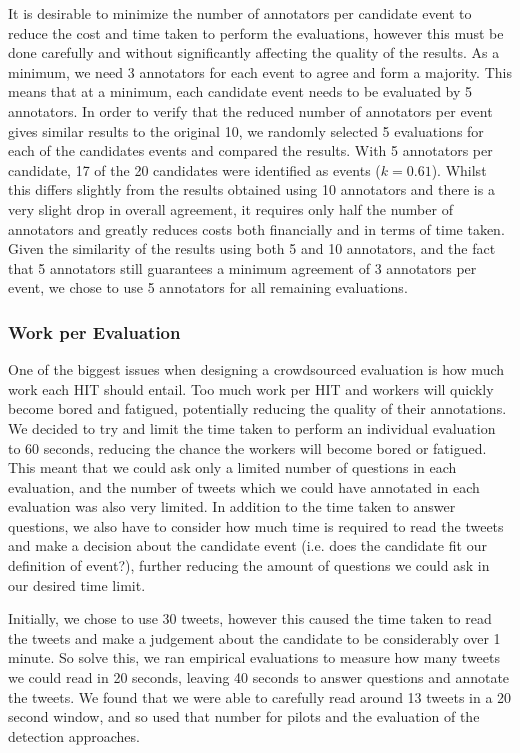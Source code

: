 It is desirable to minimize the number of annotators per candidate event to reduce the cost and time taken to perform the evaluations, however this must be done carefully and without significantly affecting the quality of the results.
As a minimum, we need 3 annotators for each event to agree and form a majority.
This means that at a minimum, each candidate event needs to be evaluated by 5 annotators.
In order to verify that the reduced number of annotators per event gives similar results to the original 10, we randomly selected 5 evaluations for each of the candidates events and compared the results.
With 5 annotators per candidate, 17 of the 20 candidates were identified as events (\(k = 0.61\)).
Whilst this differs slightly from the results obtained using 10 annotators and there is a very slight drop in overall agreement, it requires only half the number of annotators and greatly reduces costs both financially and in terms of time taken.
Given the similarity of the results using both 5 and 10 annotators, and the fact that 5 annotators still guarantees a minimum agreement of 3 annotators per event, we chose to use 5 annotators for all remaining evaluations.

\subsubsection{Work per Evaluation}
\label{sec:work}
One of the biggest issues when designing a crowdsourced evaluation is how much work each HIT should entail.
Too much work per HIT and workers will quickly become bored and fatigued, potentially reducing the quality of their annotations.
We decided to try and limit the time taken to perform an individual evaluation to 60 seconds, reducing the chance the workers will become bored or fatigued.
This meant that we could ask only a limited number of questions in each evaluation, and the number of tweets which we could have annotated in each evaluation was also very limited.
In addition to the time taken to answer questions, we also have to consider how much time is required to read the tweets and make a decision about the candidate event (i.e. does the candidate fit our definition of event?), further reducing the amount of questions we could ask in our desired time limit.

Initially, we chose to use 30 tweets, however this caused the time taken to read the tweets and make a judgement about the candidate to be considerably over 1 minute.
So solve this, we ran empirical evaluations to measure how many tweets we could read in 20 seconds, leaving 40 seconds to answer questions and annotate the tweets.
We found that we were able to carefully read around 13 tweets in a 20 second window, and so used that number for pilots and the evaluation of the detection approaches.

